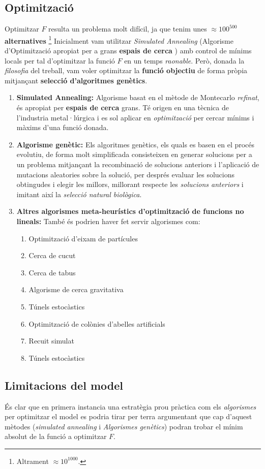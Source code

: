 \documentclass[10pt,twocolumn]{article}
\begin{document}
\subsection{Optimització}
Optimitzar $F$ resulta un problema molt difícil, ja que tenim unes $\approx 100^{500}$ \textbf{alternatives} \footnote{Altrament $ \approx 10^{1000}$.} Inicialment vam utilitzar \textit{Simulated Annealing} (Algorisme d'Optimització apropiat per a grans \textbf{espais de cerca} ) amb control de mínims locals per tal d'optimitzar  la funció $F$ en un temps \textit{raonable}. Però, donada la \textit{filosofia} del treball, vam voler  optimitzar la \textbf{funció objectiu} de forma pròpia mitjançant \textbf{selecció d'algoritmes genètics}.   
\begin{enumerate}
	\item \textbf{Simulated Annealing:} Algorisme basat en el mètode de Montecarlo \textit{refinat}, és apropiat per \textbf{espais de cerca} grans. Té origen en una tècnica de l'industria metal·lúrgica i es sol aplicar en \textit{optimització} per cercar mínims i màxims d'una funció donada.
	\item \textbf{Algorisme genètic:} Els algoritmes genètics, els quals es basen en el procés evolutiu, de forma molt simplificada consisteixen en generar solucions per a un problema mitjançant la recombinació de solucions anteriors i l'aplicació de mutacions aleatories sobre la solució, per després evaluar les solucions obtingudes i elegir les millors, millorant respecte les \textit{solucions anteriors} i imitant així la \textit{selecció natural biològica}.
	\item \textbf{Altres algorismes meta-heurístics d'optimització de funcions no lineals:} També és podrien haver fet servir algorismes com:  
	\begin{enumerate}
		\item Optimització d'eixam de partícules
		\item Cerca de cucut
		\item Cerca de tabus
		\item Algorisme de cerca gravitativa
		\item Túnels estocàstics
		\item Optimització de colònies d’abelles artificials
		\item Recuit simulat
		\item Túnels estocàstics
	\end{enumerate}
\end{enumerate}
\subsection{Limitacions del model}
És clar que en primera instancia una estratègia prou pràctica com els \textit{algorismes} per optimitzar el model es podria tirar per terra argumentant que cap d'aquest mètodes (\textit{simulated annealing} i \textit{Algorismes genètics}) podran trobar el mínim absolut de la funció a optimitzar $F$. 
\end{document}

